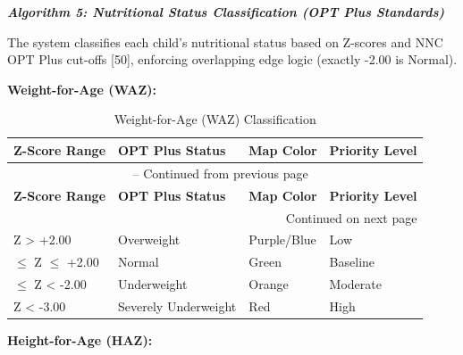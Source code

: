 \documentclass[12pt, a4paper]{report}
\begin{document}
\noindent \textbf{\textit{Algorithm 5: Nutritional Status Classification (OPT Plus Standards)}}

The system classifies each child's nutritional status based on Z-scores and NNC OPT Plus cut-offs [50], enforcing overlapping edge logic (exactly -2.00 is Normal).

\noindent \textbf{Weight-for-Age (WAZ):}

\vspace{0.3cm}
\begin{longtable}{p{3cm} p{3cm} p{3cm} p{3cm}}
    \caption{Weight-for-Age (WAZ) Classification} \label{tab:waz_class} \\
    \toprule
    \textbf{Z-Score Range} & \textbf{OPT Plus Status} & \textbf{Map Color} & \textbf{Priority Level} \\
    \midrule
    \endfirsthead
    \multicolumn{4}{c}{{\tablename\ \thetable{} -- Continued from previous page}} \\
    \toprule
    \textbf{Z-Score Range} & \textbf{OPT Plus Status} & \textbf{Map Color} & \textbf{Priority Level} \\
    \midrule
    \endhead
    \midrule
    \multicolumn{4}{r}{{Continued on next page}} \\
    \endfoot
    \bottomrule
    \endlastfoot
    Z > +2.00 & Overweight & Purple/Blue & Low \\
    \addlinespace
    -2.00 \(\leq\) Z \(\leq\) +2.00 & Normal & Green & Baseline \\
    \addlinespace
    -3.00 \(\leq\) Z < -2.00 & Underweight & Orange & Moderate \\
    \addlinespace
    Z < -3.00 & Severely Underweight & Red & High \\
\end{longtable}
\vspace{0.3cm}

\noindent \textbf{Height-for-Age (HAZ):}
\end{document}
